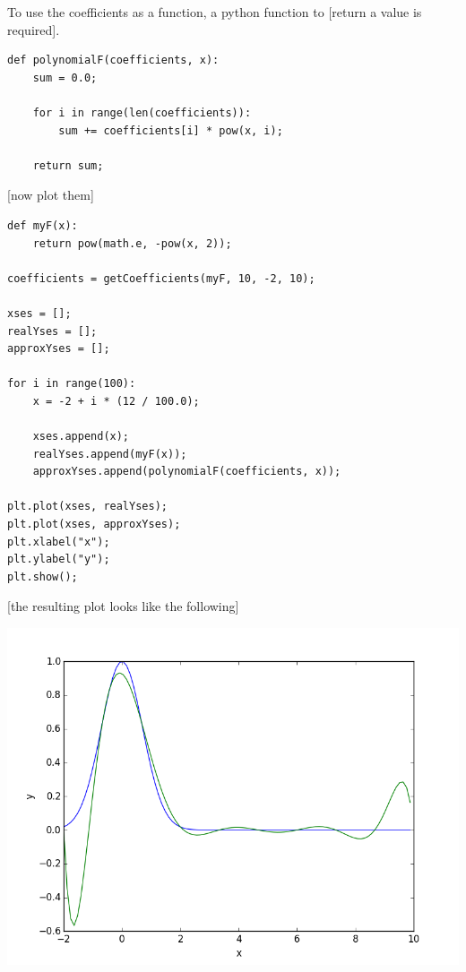 To use the coefficients as a function, a python function to [return a value is required].

\begin{lstlisting}[caption=Function which uses the calculated coefficients]
def polynomialF(coefficients, x):
	sum = 0.0;
	
	for i in range(len(coefficients)):
		sum += coefficients[i] * pow(x, i);
	
	return sum;
\end{lstlisting}

[now plot them]

\begin{lstlisting}[caption=todo]
def myF(x):
	return pow(math.e, -pow(x, 2));

coefficients = getCoefficients(myF, 10, -2, 10);

xses = [];
realYses = [];
approxYses = [];

for i in range(100):
	x = -2 + i * (12 / 100.0);
	
	xses.append(x);
	realYses.append(myF(x));
	approxYses.append(polynomialF(coefficients, x));

plt.plot(xses, realYses);
plt.plot(xses, approxYses);
plt.xlabel("x");
plt.ylabel("y");
plt.show();
\end{lstlisting}

[the resulting plot looks like the following]

\includegraphics[width=1\textwidth]{chapters/images/figure-5-9-b}

